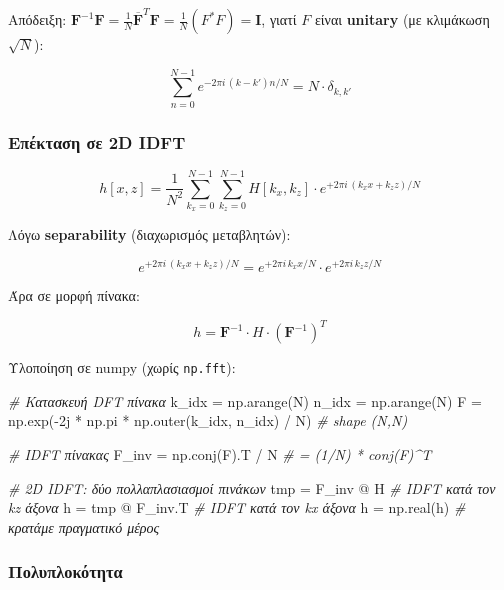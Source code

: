 \documentclass[a4paper, 11pt]{article}
\newenvironment{Shaded}{\begin{snugshade}}{\end{snugshade}}
\newcommand{\CommentTok}[1]{\textcolor[rgb]{0.38,0.63,0.69}{\textit{#1}}}
\newcommand{\NormalTok}[1]{#1}
\newcommand{\OperatorTok}[1]{\textcolor[rgb]{0.40,0.40,0.40}{#1}}
\newcommand{\OtherTok}[1]{\textcolor[rgb]{0.13,0.29,0.53}{#1}}
\begin{document}
Απόδειξη:
\(\mathbf{F}^{-1}\mathbf{F} = \frac{1}{N}\overline{\mathbf{F}}^T \mathbf{F} = \frac{1}{N}(F^*F) = \mathbf{I}\),
γιατί \(F\) είναι \textbf{unitary} (με κλιμάκωση \(\sqrt{N}\)):

\[\sum_{n=0}^{N-1} e^{-2\pi i\,(k-k')n/N} = N \cdot \delta_{k,k'}\]

\subsubsection{Επέκταση σε 2D
IDFT}\label{ux3b5ux3c0ux3adux3baux3c4ux3b1ux3c3ux3b7-ux3c3ux3b5-2d-idft}

\[h[x,z] = \frac{1}{N^2} \sum_{k_x=0}^{N-1} \sum_{k_z=0}^{N-1} H[k_x,k_z] \cdot e^{+2\pi i\,(k_x x + k_z z)/N}\]

Λόγω \textbf{separability} (διαχωρισμός μεταβλητών):

\[e^{+2\pi i\,(k_x x + k_z z)/N} = e^{+2\pi i\,k_x x/N} \cdot e^{+2\pi i\,k_z z/N}\]

Άρα σε μορφή πίνακα:

\[\boxed{h = \mathbf{F}^{-1} \cdot H \cdot (\mathbf{F}^{-1})^T}\]

Υλοποίηση σε numpy (χωρίς \texttt{np.fft}):

\begin{Shaded}
\begin{Highlighting}[]
\CommentTok{\# Κατασκευή DFT πίνακα}
\NormalTok{k\_idx }\OperatorTok{=}\NormalTok{ np.arange(N)}
\NormalTok{n\_idx }\OperatorTok{=}\NormalTok{ np.arange(N)}
\NormalTok{F     }\OperatorTok{=}\NormalTok{ np.exp(}\OperatorTok{{-}}\OtherTok{2j} \OperatorTok{*}\NormalTok{ np.pi }\OperatorTok{*}\NormalTok{ np.outer(k\_idx, n\_idx) }\OperatorTok{/}\NormalTok{ N)  }\CommentTok{\# shape (N,N)}
 
\CommentTok{\# IDFT πίνακας}
\NormalTok{F\_inv }\OperatorTok{=}\NormalTok{ np.conj(F).T }\OperatorTok{/}\NormalTok{ N   }\CommentTok{\# = (1/N) * conj(F)\^{}T}
 
\CommentTok{\# 2D IDFT: δύο πολλαπλασιασμοί πινάκων}
\NormalTok{tmp }\OperatorTok{=}\NormalTok{ F\_inv }\OperatorTok{@}\NormalTok{ H          }\CommentTok{\# IDFT κατά τον kz άξονα}
\NormalTok{h   }\OperatorTok{=}\NormalTok{ tmp }\OperatorTok{@}\NormalTok{ F\_inv.T      }\CommentTok{\# IDFT κατά τον kx άξονα}
\NormalTok{h   }\OperatorTok{=}\NormalTok{ np.real(h)         }\CommentTok{\# κρατάμε πραγματικό μέρος}
\end{Highlighting}
\end{Shaded}

\subsubsection{Πολυπλοκότητα}\label{ux3c0ux3bfux3bbux3c5ux3c0ux3bbux3bfux3baux3ccux3c4ux3b7ux3c4ux3b1-1}
\end{document}
